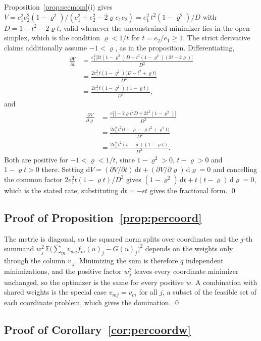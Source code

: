 Proposition~\ref{prop:secmom}(i) gives $V=e_1^2e_2^2(1-\varrho^2)/(e_1^2+e_2^2
-2\varrho e_1e_2)=e_1^2\,t^2(1-\varrho^2)/D$ with $D=1+t^2-2\varrho t$, valid
whenever the unconstrained minimizer lies in the open simplex, which is the
condition $\varrho<1/t$ for $t=e_2/e_1\ge1$. The strict derivative
claims additionally assume $-1<\varrho$, as in the proposition. Differentiating,
\[
\begin{aligned}
\frac{\partial V}{\partial t}
&=\frac{e_1^2\big[2t(1-\varrho^2)D-t^2(1-\varrho^2)(2t-2\varrho)\big]}{D^2}\\
&=\frac{2e_1^2\,t(1-\varrho^2)\big(D-t^2+\varrho t\big)}{D^2}\\
&=\frac{2e_1^2\,t(1-\varrho^2)(1-\varrho t)}{D^2},
\end{aligned}
\]
and
\[
\begin{aligned}
\frac{\partial V}{\partial\varrho}
&=\frac{e_1^2\big[-2\varrho t^2D+2t^3(1-\varrho^2)\big]}{D^2}\\
&=\frac{2e_1^2\,t^2\big(t-\varrho-\varrho t^2+\varrho^2t\big)}{D^2}\\
&=\frac{2e_1^2\,t^2(t-\varrho)(1-\varrho t)}{D^2}.
\end{aligned}
\]
Both are positive for $-1<\varrho<1/t$, since $1-\varrho^2>0$,
$t-\varrho>0$ and $1-\varrho t>0$ there. Setting
$\mathrm dV=(\partial V/\partial t)\,\mathrm dt
+(\partial V/\partial\varrho)\,\mathrm d\varrho=0$ and cancelling the common
factor $2e_1^2t(1-\varrho t)/D^2$ gives
$(1-\varrho^2)\,\mathrm dt+t(t-\varrho)\,\mathrm d\varrho=0$, which is the
stated rate; substituting $\mathrm dt=-\epsilon t$ gives the fractional
form. \qed

\subsection{Proof of Proposition~\ref{prop:percoord}}
\label{proof:prop:percoord}

The metric is diagonal, so the squared norm splits over coordinates and the
$j$-th summand $w_j^2\,\mathbb E\big(\sum_m v_{mj}f_m(u)_j-G(u)_j\big)^2$
depends on the weights only through the column $v_{\cdot j}$. Minimizing the
sum is therefore $q$ independent minimizations, and the positive factor
$w_j^2$ leaves every coordinate minimizer unchanged, so the optimizer is the same
for every positive $w$. A combination with shared weights is the special
case $v_{mj}=v_m$ for all $j$, a subset of the feasible set of each
coordinate problem, which gives the domination. \qed

\subsection{Proof of Corollary~\ref{cor:percoordw}}
\label{proof:cor:percoordw}

